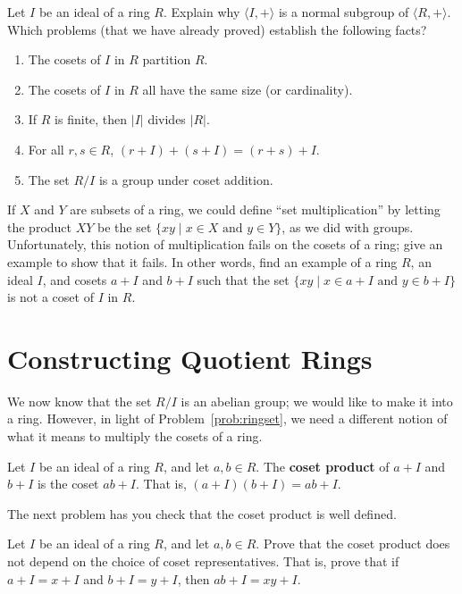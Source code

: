 \begin{problem}
Let \(I\) be an ideal of a ring \(R\). Explain why \(\langle I, +\rangle\) is a normal subgroup of \(\langle R, + \rangle \). Which problems (that we have already proved) establish the following facts?
\begin{enumerate}
  \item The cosets of \(I\) in \(R\) partition \(R\).
  \item The cosets of \(I\) in \(R\) all have the same size (or cardinality).
  \item If \(R\) is finite, then \(\lvert I \rvert \) divides \(\lvert R \rvert\).
  \item For all \(r,s \in R\), \((r+I)+(s+I) = (r+s) + I\).
  \item The set \(R/I\) is a group under coset addition.
\end{enumerate}
\end{problem}

\begin{problem}\label{prob:ringset}
If \(X\) and \(Y\) are subsets of a ring, we could define ``set multiplication'' by letting the product \(XY\) be the set \(\{xy \mid x\in X \mbox{ and } y\in Y\}\), as we did with groups. Unfortunately, this notion of multiplication fails on the cosets of a ring; give an example to show that it fails. In other words, find an example of a ring \(R\), an ideal \(I\), and cosets \(a+I\) and \(b+I\) such that the set  \(\{xy \mid x\in a+I \mbox{ and } y\in b+I\}\) is not a coset of \(I\) in \(R\).
\end{problem}

\section{Constructing Quotient Rings}
We now know that the set \(R/I\) is an abelian group; we would like to make it into a ring. However, in light of Problem~\ref{prob:ringset}, we need a different notion of what it means to multiply the cosets of a ring.

\begin{problem}
Let \(I\) be an ideal of a ring \(R\), and let \(a,b \in R\). The \textbf{coset product} of \(a+I\) and \(b+I\) is the coset \(ab+I\). That is, \( (a+I)(b+I) = ab +I\).
\end{problem}

The next problem has you check that the coset product is well defined.

\begin{problem}
Let \(I\) be an ideal of a ring \(R\), and let \(a,b \in R\). Prove that the coset product does not depend on the choice of coset representatives. That is, prove that if \(a + I = x +I\) and \(b +I = y+I\), then \(ab + I = xy +I\).
\end{problem}

